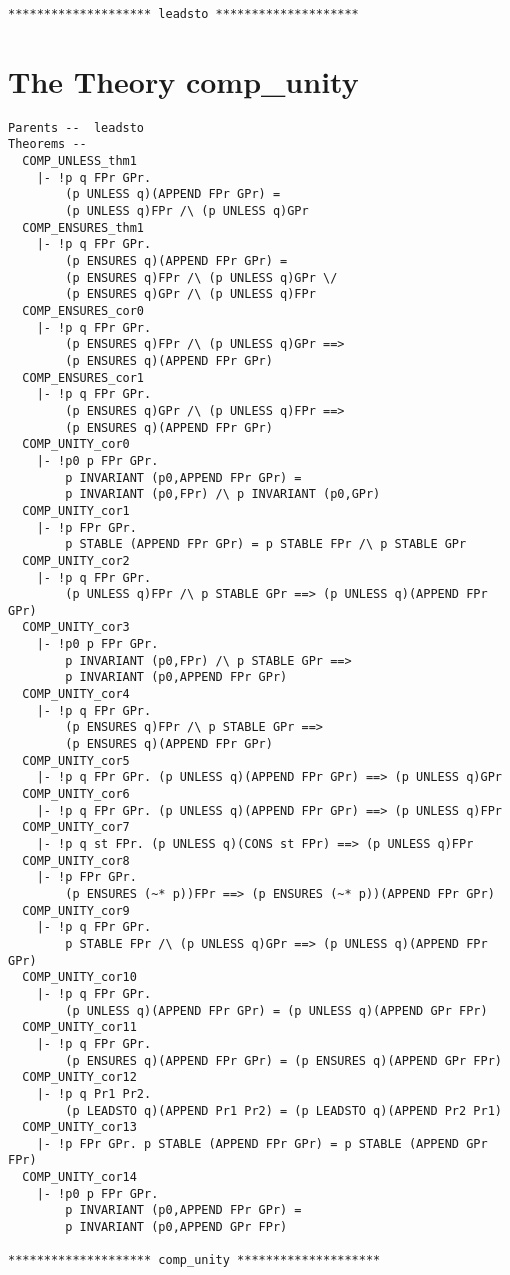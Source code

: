 {\begin{verbatim}
******************** leadsto ********************
\end{verbatim}

\section*{The Theory comp\_unity}

\begin{verbatim}
Parents --  leadsto     
Theorems --
  COMP_UNLESS_thm1
    |- !p q FPr GPr.
        (p UNLESS q)(APPEND FPr GPr) =
        (p UNLESS q)FPr /\ (p UNLESS q)GPr
  COMP_ENSURES_thm1
    |- !p q FPr GPr.
        (p ENSURES q)(APPEND FPr GPr) =
        (p ENSURES q)FPr /\ (p UNLESS q)GPr \/
        (p ENSURES q)GPr /\ (p UNLESS q)FPr
  COMP_ENSURES_cor0
    |- !p q FPr GPr.
        (p ENSURES q)FPr /\ (p UNLESS q)GPr ==>
        (p ENSURES q)(APPEND FPr GPr)
  COMP_ENSURES_cor1
    |- !p q FPr GPr.
        (p ENSURES q)GPr /\ (p UNLESS q)FPr ==>
        (p ENSURES q)(APPEND FPr GPr)
  COMP_UNITY_cor0
    |- !p0 p FPr GPr.
        p INVARIANT (p0,APPEND FPr GPr) =
        p INVARIANT (p0,FPr) /\ p INVARIANT (p0,GPr)
  COMP_UNITY_cor1
    |- !p FPr GPr.
        p STABLE (APPEND FPr GPr) = p STABLE FPr /\ p STABLE GPr
  COMP_UNITY_cor2
    |- !p q FPr GPr.
        (p UNLESS q)FPr /\ p STABLE GPr ==> (p UNLESS q)(APPEND FPr GPr)
  COMP_UNITY_cor3
    |- !p0 p FPr GPr.
        p INVARIANT (p0,FPr) /\ p STABLE GPr ==>
        p INVARIANT (p0,APPEND FPr GPr)
  COMP_UNITY_cor4
    |- !p q FPr GPr.
        (p ENSURES q)FPr /\ p STABLE GPr ==>
        (p ENSURES q)(APPEND FPr GPr)
  COMP_UNITY_cor5
    |- !p q FPr GPr. (p UNLESS q)(APPEND FPr GPr) ==> (p UNLESS q)GPr
  COMP_UNITY_cor6
    |- !p q FPr GPr. (p UNLESS q)(APPEND FPr GPr) ==> (p UNLESS q)FPr
  COMP_UNITY_cor7
    |- !p q st FPr. (p UNLESS q)(CONS st FPr) ==> (p UNLESS q)FPr
  COMP_UNITY_cor8
    |- !p FPr GPr.
        (p ENSURES (~* p))FPr ==> (p ENSURES (~* p))(APPEND FPr GPr)
  COMP_UNITY_cor9
    |- !p q FPr GPr.
        p STABLE FPr /\ (p UNLESS q)GPr ==> (p UNLESS q)(APPEND FPr GPr)
  COMP_UNITY_cor10
    |- !p q FPr GPr.
        (p UNLESS q)(APPEND FPr GPr) = (p UNLESS q)(APPEND GPr FPr)
  COMP_UNITY_cor11
    |- !p q FPr GPr.
        (p ENSURES q)(APPEND FPr GPr) = (p ENSURES q)(APPEND GPr FPr)
  COMP_UNITY_cor12
    |- !p q Pr1 Pr2.
        (p LEADSTO q)(APPEND Pr1 Pr2) = (p LEADSTO q)(APPEND Pr2 Pr1)
  COMP_UNITY_cor13
    |- !p FPr GPr. p STABLE (APPEND FPr GPr) = p STABLE (APPEND GPr FPr)
  COMP_UNITY_cor14
    |- !p0 p FPr GPr.
        p INVARIANT (p0,APPEND FPr GPr) =
        p INVARIANT (p0,APPEND GPr FPr)
  
******************** comp_unity ********************
\end{verbatim}
}

